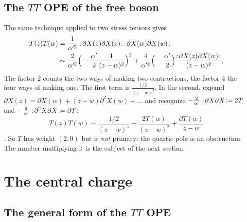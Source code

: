 \subsection{The \texorpdfstring{$TT$}{TT} OPE of the free boson}

The same technique applied to two stress tensors gives
\begin{align}
  T(z)T(w)&=\frac{1}{\alpha'^2}:\!\partial X(z)\partial X(z)\!:\,:\!\partial X(w)\partial X(w)\!:
   \nonumber\\
  &\sim\frac{2}{\alpha'^2}\Big(-\frac{\alpha'}2\frac{1}{(z-w)^2}\Big)^2
   +\frac{4}{\alpha'^2}\Big(-\frac{\alpha'}2\Big)\frac{:\!\partial X(z)\partial X(w)\!:}{(z-w)^2}.
   \label{eq:cft:TTwick}
\end{align}
The factor $2$ counts the two ways of making two contractions, the factor $4$ the four ways of
making one. The first term is $\frac{1/2}{(z-w)^4}$. In the second, expand
$\partial X(z)=\partial X(w)+(z-w)\partial^2X(w)+\dots$ and recognize
$-\frac2{\alpha'}:\!\partial X\partial X\!:=2T$ and $-\frac2{\alpha'}:\!\partial^2X\partial X\!:=\partial T$:
\begin{equation}\label{eq:cft:TTfree}
  T(z)T(w)\sim\frac{1/2}{(z-w)^4}+\frac{2T(w)}{(z-w)^2}+\frac{\partial T(w)}{z-w}
\end{equation}
. So $T$ has weight $(2,0)$ but is \emph{not} primary: the
quartic pole is an obstruction. The number multiplying it is the subject of the next section.

\section{The central charge}\label{sec:cft:c}

\subsection{The general form of the \texorpdfstring{$TT$}{TT} OPE}

